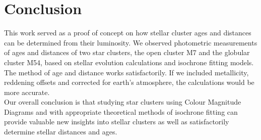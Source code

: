\documentclass[12pt]{article}
\begin{document}
	\section{Conclusion}
	This work served as a proof of concept on how stellar cluster ages and distances can be determined from their luminosity. We observed photometric measurements of ages and distances of two star clusters, the open cluster M7 and the globular cluster M54, based on stellar evolution calculations and isochrone fitting models.\\
	The method of age and distance works satisfactorily. If we included metallicity, reddening offsets and corrected for earth's atmosphere, the calculations would be more accurate.\\
	Our overall conclusion is that studying star clusters using Colour Magnitude Diagrams and with appropriate theoretical methods of isochrone fitting can provide valuable new insights into stellar clusters as well as satisfactorily determine stellar distances and ages.
		
\end{document}
